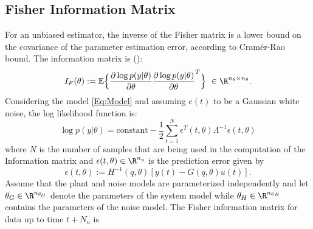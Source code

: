 \documentclass{ifacconf}
\begin{document}
\subsection{Fisher Information Matrix}
\label{Sec:Fisher Information Matrix}
For an unbiased estimator, the inverse of the Fisher matrix is a lower bound on the covariance of the parameter estimation error, according to Cram\'{e}r-Rao bound. The information matrix is (\cite{Goodwin&Payne:77}):
\begin{equation}
I_F(\theta) := \mathbb{E} \Big \{
						\frac{\partial \log p(y|\theta)}{\partial \theta}  \frac{\partial \log p(y|\theta)}{\partial \theta}^T
						\Big\} \ \in \R^{n_{\theta} \times n_{\theta} }.
\end{equation}
Considering the model \eqref{Eq:Model} and assuming $e(t)$ to be a Gaussian white noise, the log likelihood function is:
\vspace{-0.0cm}
\begin{equation}
\log p(y|\theta) = \text{constant} - \frac{1}{2} \sum_{t =1}^{N} \epsilon^T(t,\theta) \Lambda^{-1}\epsilon(t,\theta)
\end{equation}
\vspace{-0.0cm}
where $N$ is the number of samples that are being used in the computation of the Information matrix and $\epsilon(t,\theta) \in \R^{n_y}$ is the prediction error given by
\begin{equation}
\nonumber
\epsilon(t,\theta) := H^{-1}(q,\theta) [ y(t) - G(q,\theta) u(t) ].
\end{equation}
Assume that the plant and noise models are parameterized independently and let $\theta_G \in \R^{n_{\theta_G}}$ denote the parameters of the system model while $\theta_H \in \R^{{n_\theta}_H}$ contains the parameters of the noise model. The Fisher information matrix for data up to time $t+N_u$ is
\end{document}
